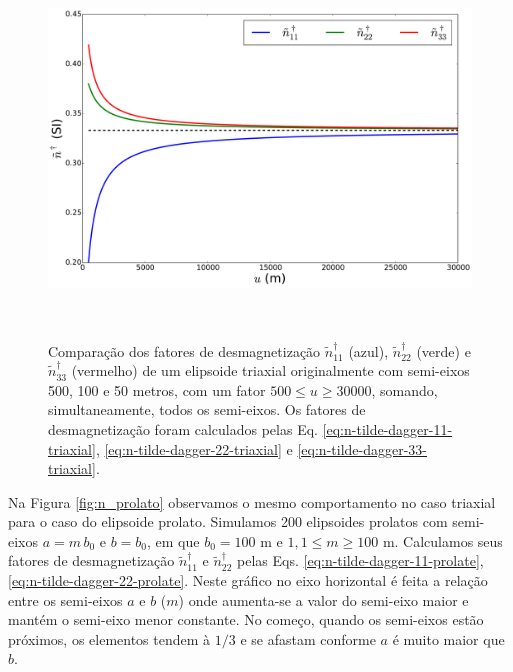 \begin{figure}[hbt!]
	\centering \includegraphics[width=15cm,height=10cm]{figures/test_n_triaxial}
	\caption[Comparação dos fatores de desmagnetização
	$\tilde{n}^{\dagger}_{11}$ (azul), $\tilde{n}^{\dagger}_{22}$ (verde) e $\tilde{n}^{\dagger}_{33}$ (vermelho) de um elipsoide triaxial originalmente com semi-eixos 500, 100 e 50 metros, com um fator $500 \le u \ge 30000$, somando, simultaneamente, todos os semi-eixos. Os fatores de desmagnetização foram calculados pelas Eq. \ref{eq:n-tilde-dagger-11-triaxial}, \ref{eq:n-tilde-dagger-22-triaxial} e \ref{eq:n-tilde-dagger-33-triaxial}.]{Comparação dos fatores de desmagnetização
		$\tilde{n}^{\dagger}_{11}$ (azul), $\tilde{n}^{\dagger}_{22}$ (verde) e $\tilde{n}^{\dagger}_{33}$ (vermelho) de um elipsoide triaxial originalmente com semi-eixos 500, 100 e 50 metros, com um fator $500 \le u \ge 30000$, somando, simultaneamente, todos os semi-eixos. Os fatores de desmagnetização foram calculados pelas Eq. \ref{eq:n-tilde-dagger-11-triaxial}, \ref{eq:n-tilde-dagger-22-triaxial} e \ref{eq:n-tilde-dagger-33-triaxial}.}
	\label{fig:n_triaxial}
\end{figure}

Na Figura \ref{fig:n_prolato} observamos o mesmo comportamento no caso triaxial para o caso do elipsoide prolato. Simulamos 200 elipsoides prolatos com semi-eixos $a=m\, b_0$ e $b=b_0$, em que $b_0=100$ m e $1,1 \le m \ge 100$ m. Calculamos seus fatores de desmagnetização $\tilde{n}^{\dagger}_{11}$ e $\tilde{n}^{\dagger}_{22}$ pelas Eqs. \ref{eq:n-tilde-dagger-11-prolate}, \ref{eq:n-tilde-dagger-22-prolate}.
Neste gráfico no eixo horizontal é feita a relação entre os semi-eixos $a$ e $b$ ($m$) onde aumenta-se a valor do semi-eixo maior e mantém o semi-eixo menor constante. No começo, quando os semi-eixos estão próximos, os elementos tendem à $1/3$ e se afastam conforme $a$ é muito maior que $b$.
\newpage

